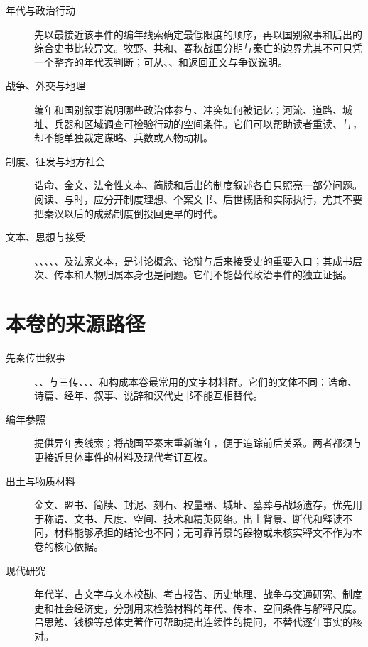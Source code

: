 \begin{description}
  \item[年代与政治行动] 先以最接近该事件的编年线索确定最低限度的顺序，再以国别叙事和后出的综合史书比较异文。牧野、共和、春秋战国分期与秦亡的边界尤其不可只凭一个整齐的年代表判断；可从、、和返回正文与争议说明。
  \item[战争、外交与地理] 编年和国别叙事说明哪些政治体参与、冲突如何被记忆；河流、道路、城址、兵器和区域调查可检验行动的空间条件。它们可以帮助读者重读、与，却不能单独裁定谋略、兵数或人物动机。
  \item[制度、征发与地方社会] 诰命、金文、法令性文本、简牍和后出的制度叙述各自只照亮一部分问题。阅读、与时，应分开制度理想、个案文书、后世概括和实际执行，尤其不要把秦汉以后的成熟制度倒投回更早的时代。
  \item[文本、思想与接受] 、、、、、及法家文本，是讨论概念、论辩与后来接受史的重要入口；其成书层次、传本和人物归属本身也是问题。它们不能替代政治事件的独立证据。
\end{description}

\section{本卷的来源路径}

\begin{description}
  \item[先秦传世叙事] 、、与三传、、、和构成本卷最常用的文字材料群。它们的文体不同：诰命、诗篇、经年、叙事、说辞和汉代史书不能互相替代。
  \item[编年参照] 提供异年表线索；将战国至秦末重新编年，便于追踪前后关系。两者都须与更接近具体事件的材料及现代考订互校。
  \item[出土与物质材料] 金文、盟书、简牍、封泥、刻石、权量器、城址、墓葬与战场遗存，优先用于称谓、文书、尺度、空间、技术和精英网络。出土背景、断代和释读不同，材料能够承担的结论也不同；无可靠背景的器物或未核实释文不作为本卷的核心依据。
  \item[现代研究] 年代学、古文字与文本校勘、考古报告、历史地理、战争与交通研究、制度史和社会经济史，分别用来检验材料的年代、传本、空间条件与解释尺度。吕思勉、钱穆等总体史著作可帮助提出连续性的提问，不替代逐年事实的核对。
\end{description}

